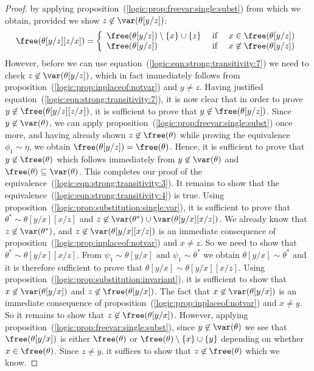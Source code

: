 \begin{proof}
by applying proposition~(\ref{logic:prop:freevar:single:subst}) from
which we obtain, provided we show $z\not\in\var(\theta[y/z])$:
    \begin{equation}\label{logic:eqn:strong:transitivity:7}
    \free(\theta[y/z][z/x])=\left\{\begin{array}{lcl}
    \free(\theta[y/z])\setminus\{x\}\cup\{z\}&\mbox{\ if\ }&x\in\free(\theta[y/z])\\
    \free(\theta[y/z])&\mbox{\ if\ }&x\not\in\free(\theta[y/z])
    \end{array}
    \right.
    \end{equation}
However, before we can use
equation~(\ref{logic:eqn:strong:transitivity:7}) we need to check
$z\not\in\var(\theta[y/z])$, which in fact immediately follows from
proposition~(\ref{logic:prop:inplaceof:notvar}) and $y\neq z$.
Having justified equation~(\ref{logic:eqn:strong:transitivity:7}),
it is now clear that in order to prove
$y\not\in\free(\theta[y/z][z/x])$, it is sufficient to prove that
$y\not\in\free(\theta[y/z])$. Since $y\not\in\var(\theta)$, we can
apply proposition~(\ref{logic:prop:freevar:single:subst}) once more,
and having already shown $z\not\in\free(\theta)$ while proving the
equivalence $\phi_{1}\sim\eta$, we obtain
$\free(\theta[y/z])=\free(\theta)$. Hence, it is sufficient to prove
that $y\not\in\free(\theta)$ which follows immediately from
$y\not\in\var(\theta)$ and $\free(\theta)\subseteq\var(\theta)$.
This completes our proof of the
equivalence~(\ref{logic:eqn:strong:transitivity:3}). It remains to
show that the equivalence~(\ref{logic:eqn:strong:transitivity:4}) is
true. Using proposition~(\ref{logic:prop:substitution:single:var}),
it is sufficient to prove that $\theta^{*}\sim\theta[y/x][x/z]$ and
$z\not\in\var(\theta^{*})\cup\var(\theta[y/x][x/z])$. We already
know that $z\not\in\var(\theta^{*})$, and
$z\not\in\var(\theta[y/x][x/z])$ is an immediate consequence of
proposition~(\ref{logic:prop:inplaceof:notvar}) and $x\neq z$. So we
need to show that $\theta^{*}\sim\theta[y/x][x/z]$. From
$\psi_{1}\sim\theta[y/x]$ and $\psi_{1}\sim\theta^{*}$ we obtain
$\theta[y/x]\sim\theta^{*}$ and it is therefore sufficient to prove
that $\theta[y/x]\sim\theta[y/x][x/z]$. Using
proposition~(\ref{logic:prop:substitution:invariant}), it is
sufficient to show that $x\not\in\var(\theta[y/x])$ and
$z\not\in\free(\theta[y/x])$. The fact that
$x\not\in\var(\theta[y/x])$ is an immediate consequence of
proposition~(\ref{logic:prop:inplaceof:notvar}) and $x\neq y$. So it
remains to show that $z\not\in\free(\theta[y/x])$. However, applying 
proposition~(\ref{logic:prop:freevar:single:subst}), since
$y\not\in\var(\theta)$ we see that $\free(\theta[y/x])$ is either
$\free(\theta)$ or $\free(\theta)\setminus\{x\}\cup\{y\}$ depending
on whether $x\in\free(\theta)$. Since $z\neq y$, it suffices to
show that $z\not\in\free(\theta)$ which we know.
\end{proof}

